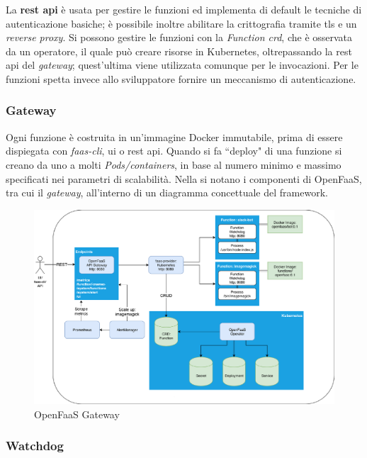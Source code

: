 \documentclass[12pt,a4paper,openany,twoside]{book}
\begin{document}
La \textbf{\ac{rest} \ac{api}} è usata per gestire le funzioni ed implementa di default le tecniche di autenticazione basiche; è possibile inoltre abilitare la crittografia tramite \ac{tls} e un \textit{reverse proxy}.
Si possono gestire le funzioni con la \textit{Function \ac{crd}}, che è osservata da un operatore, il quale può creare risorse in Kubernetes, oltrepassando la \ac{rest} \ac{api} del \textit{gateway}; quest'ultima viene utilizzata comunque per le invocazioni. Per le funzioni spetta invece allo sviluppatore fornire un meccanismo di autenticazione.

\subsubsection{Gateway}

Ogni funzione è costruita in un'immagine Docker immutabile, prima di essere dispiegata con \textit{faas-cli}, \ac{ui} o \ac{rest} \ac{api}.
Quando si fa ``deploy" di una funzione si creano da uno a molti \textit{Pods/containers}, in base al numero minimo e massimo specificati nei parametri di scalabilità.
Nella  si notano i componenti di OpenFaaS, tra cui il \textit{gateway}, all'interno di un diagramma concettuale del framework.

\begin{figure}[h]
    \centering
    \includegraphics[width=\linewidth]{figures/OpenFaaS_gateway.pdf}
    \caption{OpenFaaS Gateway}
    \label{fig:openfaas-gateway}
\end{figure}

\subsubsection{Watchdog}
\end{document}
